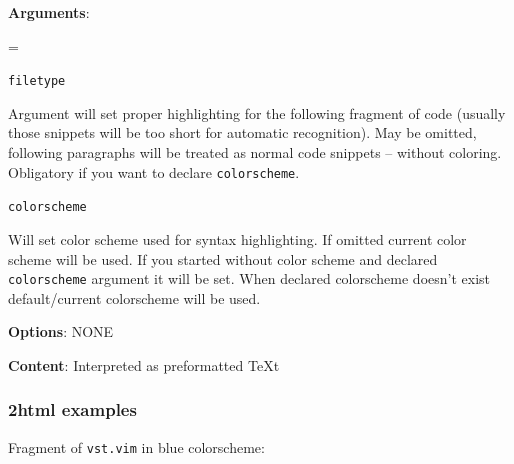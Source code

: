 \documentclass[12pt]{article}
\newenvironment{deflist}[1]{%
\begin{list}{}
{\renewcommand{\makelabel}[1]{\textbf{##1}\hfill}
\settowidth{\labelwidth}{\textbf{#1}}
\leftmargin=\labelwidth
\advance \leftmargin\labelsep}}
{\end{list}}
\begin{document}
\begin{itemize}
\item
\textbf{Arguments}:

 \begin{deflist}{iii}

\item[ \texttt{filetype} ]

Argument will set proper highlighting for the following fragment of
code (usually those snippets will be too short for automatic
recognition). May be omitted, following paragraphs will be treated
as normal code snippets -- without coloring. Obligatory if you want
to declare \texttt{colorscheme}.

\item[ \texttt{colorscheme}]

Will set color scheme used for syntax highlighting. If omitted
current color scheme will be used. If you started without color
scheme and declared \texttt{colorscheme} argument it will be set. When
declared colorscheme doesn't exist default/current colorscheme will
be used.
\end{deflist}

\item
\textbf{Options}: NONE

\item
\textbf{Content}: Interpreted as preformatted \TeX{}t
\end{itemize}
\begin{center}
\end{center}
\hypertarget{l2html-examples}{}
\subsubsection{2html examples}

Fragment of \texttt{vst.vim} in blue colorscheme:
\end{document}
